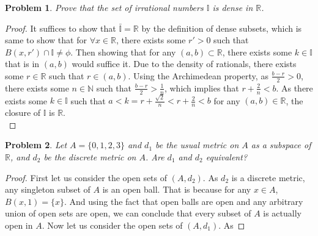 \documentclass[paper=a4, fontsize=11pt]{scrartcl}
\newtheorem{problem}{Problem}
\begin{document}
\begin{problem}
	Prove that the set of irrational numbers $\mathbb{I}$ is dense in $\mathbb{R}$. \\
\end{problem}

\begin{proof}
	It suffices to show that $\bar{\mathbb{I}} = \mathbb{R}$ by the definition of dense subsets, which is same to show that for $\forall x \in \mathbb{R}$, there exists some $r'>0$ such that $B(x,r')\cap \mathbb{I} \neq \phi$. Then showing that for any $(a,b)\subset \mathbb{R}$, there exists some $k \in \mathbb{I}$ that is in $(a,b)$ would suffice it. Due to the density of rationals, there exists some $r \in \mathbb{R}$ such that $r \in (a,b)$. Using the Archimedean property, as $\frac{b-r}{2}>0$, there exists some $n \in \mathbb{N}$ such that $\frac{b-r}{2}> \frac{1}{n}$, which implies that $r+\frac{2}{n}<b$. As there exists some $k \in \mathbb{I}$ such that $a < k = r+\frac{\sqrt{2}}{n} < r+ \frac{2}{n} < b$ for any $(a,b) \in \mathbb{R}$, the closure of $\mathbb{I}$ is $\mathbb{R}$. \\
\end{proof}

\begin{problem}
	Let $A=\{0,1,2,3\}$ and $d_1$ be the usual metric on $A$ as a subspace of $\mathbb{R}$, and $d_2$ be the discrete metric on $A$. Are $d_1$ and $d_2$ equivalent? \\
\end{problem}

\begin{proof}
	First let us consider the open sets of $(A,d_2)$. As $d_2$ is a discrete metric, any singleton subset of $A$ is an open ball. That is because for any $x \in A$, $B(x,1)=\{x\}$. And using the fact that open balls are open and any arbitrary union of open sets are open, we can conclude that every subset of $A$ is actually open in $A$. Now let us consider the open sets of $(A,d_1)$. As
\end{proof}
\end{document}
